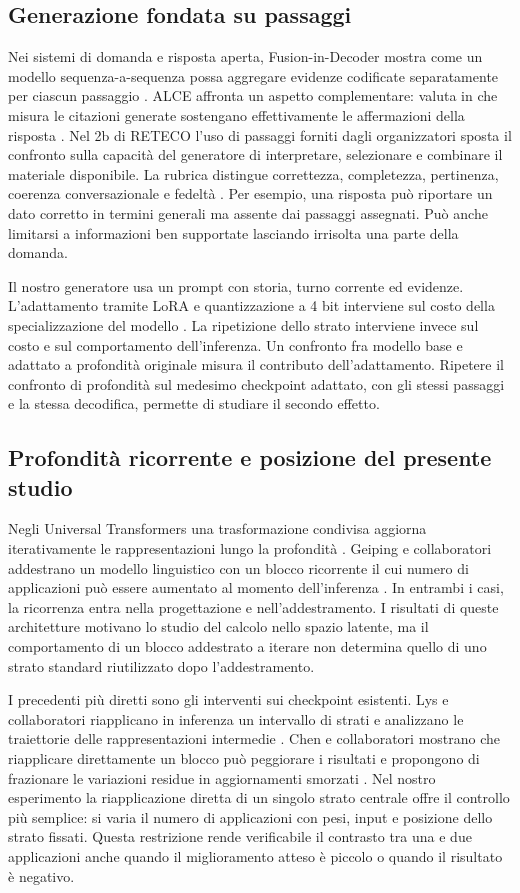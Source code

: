 \subsection{Generazione fondata su passaggi}
Nei sistemi di domanda e risposta aperta, Fusion-in-Decoder mostra come un modello sequenza-a-sequenza possa aggregare evidenze codificate separatamente per ciascun passaggio \cite{fid}. ALCE affronta un aspetto complementare: valuta in che misura le citazioni generate sostengano effettivamente le affermazioni della risposta \cite{alce}. Nel 2b di RETECO l'uso di passaggi forniti dagli organizzatori sposta il confronto sulla capacità del generatore di interpretare, selezionare e combinare il materiale disponibile. La rubrica distingue correttezza, completezza, pertinenza, coerenza conversazionale e fedeltà \cite{evaluation}. Per esempio, una risposta può riportare un dato corretto in termini generali ma assente dai passaggi assegnati. Può anche limitarsi a informazioni ben supportate lasciando irrisolta una parte della domanda.

Il nostro generatore usa un prompt con storia, turno corrente ed evidenze. L'adattamento tramite LoRA e quantizzazione a 4 bit interviene sul costo della specializzazione del modello \cite{lora,qlora}. La ripetizione dello strato interviene invece sul costo e sul comportamento dell'inferenza. Un confronto fra modello base e adattato a profondità originale misura il contributo dell'adattamento. Ripetere il confronto di profondità sul medesimo checkpoint adattato, con gli stessi passaggi e la stessa decodifica, permette di studiare il secondo effetto.

\subsection{Profondità ricorrente e posizione del presente studio}
Negli Universal Transformers una trasformazione condivisa aggiorna iterativamente le rappresentazioni lungo la profondità \cite{universal}. Geiping e collaboratori addestrano un modello linguistico con un blocco ricorrente il cui numero di applicazioni può essere aumentato al momento dell'inferenza \cite{geiping}. In entrambi i casi, la ricorrenza entra nella progettazione e nell'addestramento. I risultati di queste architetture motivano lo studio del calcolo nello spazio latente, ma il comportamento di un blocco addestrato a iterare non determina quello di uno strato standard riutilizzato dopo l'addestramento.

I precedenti più diretti sono gli interventi sui checkpoint esistenti. Lys e collaboratori riapplicano in inferenza un intervallo di strati e analizzano le traiettorie delle rappresentazioni intermedie \cite{lys}. Chen e collaboratori mostrano che riapplicare direttamente un blocco può peggiorare i risultati e propongono di frazionare le variazioni residue in aggiornamenti smorzati \cite{chen}. Nel nostro esperimento la riapplicazione diretta di un singolo strato centrale offre il controllo più semplice: si varia il numero di applicazioni con pesi, input e posizione dello strato fissati. Questa restrizione rende verificabile il contrasto tra una e due applicazioni anche quando il miglioramento atteso è piccolo o quando il risultato è negativo.

